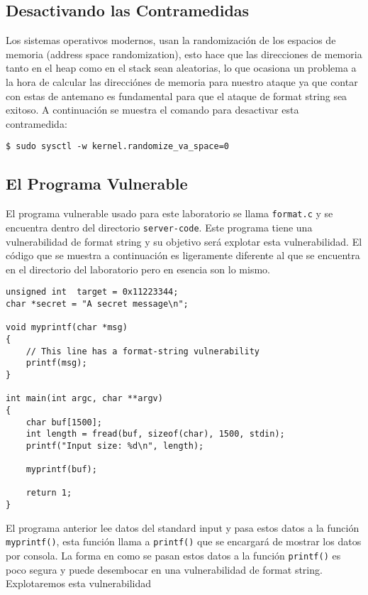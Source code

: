 \subsection{Desactivando las Contramedidas} 

Los sistemas operativos modernos, usan la randomización de los espacios de memoria (address space randomization), esto hace que las direcciones de memoria tanto en el heap como en el stack sean aleatorias, lo que ocasiona un problema a la hora de calcular las direcciónes de memoria para nuestro ataque ya que contar con estas de antemano es fundamental para que el ataque de format string sea exitoso. 
A continuación se muestra el comando para desactivar esta contramedida:


\begin{lstlisting}
$ sudo sysctl -w kernel.randomize_va_space=0
\end{lstlisting}


\subsection{El Programa Vulnerable}
\label{sec:vulnerable_program}

El programa vulnerable usado para este laboratorio se llama \texttt{format.c} y se encuentra dentro del directorio \texttt{server-code}.
Este programa tiene una vulnerabilidad de format string y su objetivo será explotar esta vulnerabilidad.
El código que se muestra a continuación es ligeramente diferente al que se encuentra en el directorio del laboratorio pero en esencia son lo mismo.

\begin{lstlisting}[label=format:code, 
       caption={The vulnerable program \texttt{format.c} (with non-essential information removed)}]
unsigned int  target = 0x11223344;
char *secret = "A secret message\n";

void myprintf(char *msg)
{
    // This line has a format-string vulnerability
    printf(msg);
}

int main(int argc, char **argv)
{
    char buf[1500];
    int length = fread(buf, sizeof(char), 1500, stdin);
    printf("Input size: %d\n", length);

    myprintf(buf);

    return 1;
}
\end{lstlisting}

El programa anterior lee datos del standard input y pasa estos datos a la función
\texttt{myprintf()}, esta función llama a \texttt{printf()} que se encargará de mostrar los datos por consola.
La forma en como se pasan estos datos a la función \texttt{printf()} es poco segura y puede desembocar en una vulnerabilidad de format string.
Explotaremos esta vulnerabilidad

